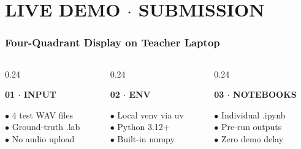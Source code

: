 \documentclass[aspectratio=169, 10pt]{beamer}
\begin{document}
\section{LIVE DEMO $\cdot$ SUBMISSION}
\begin{frame}
  \frametitle{Four-Quadrant Display on Teacher Laptop}
  \begin{tcolorbox}[contentframe]
  \begin{columns}[T]
    \begin{column}{0.24\textwidth}
      \begin{tcolorbox}[darkcard, height=2.30cm, valign=top]
        \centering
        {\fontsize{9pt}{10pt}\selectfont\color{cyanGlow}\textbf{01 $\cdot$ INPUT}}\\[3pt]
        \raggedright{\fontsize{7.5pt}{9pt}\selectfont
        $\bullet$ 4 test WAV files\\[2pt]
        $\bullet$ Ground-truth .lab\\[2pt]
        $\bullet$ No audio upload}
      \end{tcolorbox}
    \end{column}

    \begin{column}{0.24\textwidth}
      \begin{tcolorbox}[darkcard, height=2.30cm, valign=top]
        \centering
        {\fontsize{9pt}{10pt}\selectfont\color{cyanGlow}\textbf{02 $\cdot$ ENV}}\\[3pt]
        \raggedright{\fontsize{7.5pt}{9pt}\selectfont
        $\bullet$ Local venv via uv\\[2pt]
        $\bullet$ Python 3.12+\\[2pt]
        $\bullet$ Built-in numpy}
      \end{tcolorbox}
    \end{column}

    \begin{column}{0.24\textwidth}
      \begin{tcolorbox}[darkcard, height=2.30cm, valign=top]
        \centering
        {\fontsize{9pt}{10pt}\selectfont\color{cyanGlow}\textbf{03 $\cdot$ NOTEBOOKS}}\\[3pt]
        \raggedright{\fontsize{7.5pt}{9pt}\selectfont
        $\bullet$ Individual .ipynb\\[2pt]
        $\bullet$ Pre-run outputs\\[2pt]
        $\bullet$ Zero demo delay}
      \end{tcolorbox}
    \end{column}


\end{columns}
\end{tcolorbox}
\end{frame}
\end{document}
